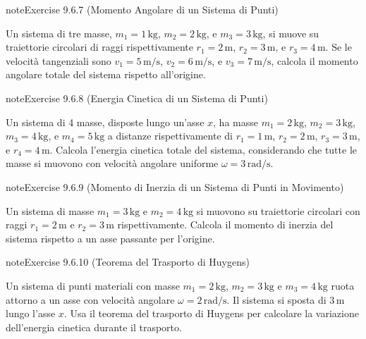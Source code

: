 \documentclass[letterpaper,10pt,italian]{jupyterBook}
\begin{document}
\begin{sphinxadmonition}{note}{Exercise 9.6.7 (Momento Angolare di un Sistema di Punti)}



\sphinxAtStartPar
Un sistema di tre masse, \(m_1 = 1 \, \text{kg}\), \(m_2 = 2 \, \text{kg}\), e \(m_3 = 3 \, \text{kg}\), si muove su traiettorie circolari di raggi rispettivamente \(r_1 = 2 \, \text{m}\), \(r_2 = 3 \, \text{m}\), e \(r_3 = 4 \, \text{m}\). Se le velocità tangenziali sono \(v_1 = 5 \, \text{m/s}\), \(v_2 = 6 \, \text{m/s}\), e \(v_3 = 7 \, \text{m/s}\), calcola il momento angolare totale del sistema rispetto all’origine.
\end{sphinxadmonition}
 \label{exercise:ch/mechanics/inertia-problems-exercise-7}

\begin{sphinxadmonition}{note}{Exercise 9.6.8 (Energia Cinetica di un Sistema di Punti)}



\sphinxAtStartPar
Un sistema di 4 masse, disposte lungo un’asse \(x\), ha masse \(m_1 = 2 \, \text{kg}\), \(m_2 = 3 \, \text{kg}\), \(m_3 = 4 \, \text{kg}\), e \(m_4 = 5 \, \text{kg}\) a distanze rispettivamente di \(r_1 = 1 \, \text{m}\), \(r_2 = 2 \, \text{m}\), \(r_3 = 3 \, \text{m}\), e \(r_4 = 4 \, \text{m}\). Calcola l’energia cinetica totale del sistema, considerando che tutte le masse si muovono con velocità angolare uniforme \(\omega = 3 \, \text{rad/s}\).
\end{sphinxadmonition}
 \label{exercise:ch/mechanics/inertia-problems-exercise-8}

\begin{sphinxadmonition}{note}{Exercise 9.6.9 (Momento di Inerzia di un Sistema di Punti in Movimento)}



\sphinxAtStartPar
Un sistema di masse \(m_1 = 3 \, \text{kg}\) e \(m_2 = 4 \, \text{kg}\) si muovono su traiettorie circolari con raggi \(r_1 = 2 \, \text{m}\) e \(r_2 = 3 \, \text{m}\) rispettivamente. Calcola il momento di inerzia del sistema rispetto a un asse passante per l’origine.
\end{sphinxadmonition}
 \label{exercise:ch/mechanics/inertia-problems-exercise-9}

\begin{sphinxadmonition}{note}{Exercise 9.6.10 (Teorema del Trasporto di Huygens)}



\sphinxAtStartPar
Un sistema di punti materiali con masse \(m_1 = 2 \, \text{kg}\), \(m_2 = 3 \, \text{kg}\) e \(m_3 = 4 \, \text{kg}\) ruota attorno a un asse con velocità angolare \(\omega = 2 \, \text{rad/s}\). Il sistema si sposta di \(3 \, \text{m}\) lungo l’asse \(x\). Usa il teorema del trasporto di Huygens per calcolare la variazione dell’energia cinetica durante il trasporto.
\end{sphinxadmonition}
\end{document}
